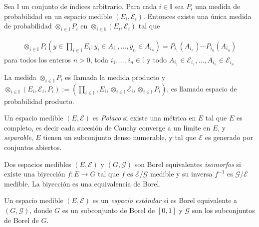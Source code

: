 \begin{Teo}
Sea $\mathbb{I}$ un conjunto de \'indices arbitrario. Para cada $i\in\mathbb{I}$ sea $P_{i}$ una medida de probabilidad en un espacio medible $\left(E_{i},\mathcal{E}_{i}\right)$. Entonces existe una \'unica medida de probabilidad $\otimes_{i\in\mathbb{I}}P_{i}$ en $\otimes_{i\in\mathbb{I}}\left(E_{i},\mathcal{E}_{i}\right)$ tal que 

\begin{eqnarray*}
\otimes_{i\in\mathbb{I}}P_{i}\left(y\in\prod_{i\in\mathbb{I}}E_{i}:y_{i}\in A_{i_{1}},\ldots,y_{n}\in A_{i_{n}}\right)=P_{i_{1}}\left(A_{i_{n}}\right)\cdots P_{i_{n}}\left(A_{i_{n}}\right)
\end{eqnarray*}
para todos los enteros $n>0$, toda $i_{1},\ldots,i_{n}\in\mathbb{I}$ y todo $A_{i_{1}}\in\mathcal{E}_{i_{1}},\ldots,A_{i_{n}}\in\mathcal{E}_{i_{n}}$
\end{Teo}

La medida $\otimes_{i\in\mathbb{I}}P_{i}$ es llamada la medida producto y $\otimes_{i\in\mathbb{I}}\left(E_{i},\mathcal{E}_{i},P_{i}\right):=\left(\prod_{i\in\mathbb{I}},E_{i},\otimes_{i\in\mathbb{I}}\mathcal{E}_{i},\otimes_{i\in\mathbb{I}}P_{i}\right)$, es llamado espacio de probabilidad producto.


\begin{Def}
Un espacio medible $\left(E,\mathcal{E}\right)$ es \textit{Polaco} si existe una m\'etrica en $E$ tal que $E$ es completo, es decir cada sucesi\'on de Cauchy converge a un l\'imite en $E$, y \textit{separable}, $E$ tienen un subconjunto denso numerable, y tal que $\mathcal{E}$ es generado por conjuntos abiertos.
\end{Def}


\begin{Def}
Dos espacios medibles $\left(E,\mathcal{E}\right)$ y $\left(G,\mathcal{G}\right)$ son Borel equivalentes \textit{isomorfos} si existe una biyecci\'on $f:E\rightarrow G$ tal que $f$ es $\mathcal{E}/\mathcal{G}$ medible y su inversa $f^{-1}$ es $\mathcal{G}/\mathcal{E}$ medible. La biyecci\'on es una equivalencia de Borel.
\end{Def}

\begin{Def}
Un espacio medible  $\left(E,\mathcal{E}\right)$ es un \textit{espacio est\'andar} si es Borel equivalente a $\left(G,\mathcal{G}\right)$, donde $G$ es un subconjunto de Borel de $\left[0,1\right]$ y $\mathcal{G}$ son los subconjuntos de Borel de $G$.
\end{Def}

